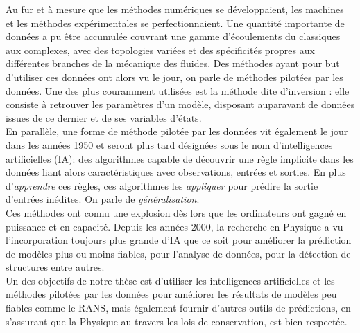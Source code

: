 \documentclass[a4paper,12pt]{article}
\numberwithin{equation}{section} %
\begin{document}
\noindent Au fur et à mesure que les méthodes numériques se développaient, les machines et les méthodes expérimentales se perfectionnaient. Une quantité importante de données a pu être accumulée couvrant une gamme d'écoulements du classiques aux complexes, avec des topologies variées et des spécificités propres aux différentes branches de la mécanique des fluides. Des méthodes ayant pour but d'utiliser ces données ont alors vu le jour, on parle de méthodes pilotées par les données. Une des plus couramment utilisées est la méthode dite d'inversion : elle consiste à retrouver les paramètres d'un modèle, disposant auparavant de données issues de ce dernier et de ses variables d'états. \\

\noindent En parallèle, une forme de méthode pilotée par les données vit également le jour dans les années 1950 et seront plus tard désignées sous le nom d'intelligences artificielles (IA): des algorithmes capable de découvrir une règle implicite dans les données liant alors caractéristiques avec observations, entrées et sorties. En plus d'\textit{apprendre} ces règles, ces algorithmes les \textit{appliquer} pour prédire la sortie d'entrées inédites. On parle de \textit{généralisation}.\\
Ces méthodes ont connu une explosion dès lors que les ordinateurs ont gagné en puissance et en capacité. Depuis les années 2000, la recherche en Physique a vu l'incorporation toujours plus grande d'IA que ce soit pour améliorer la prédiction de modèles plus ou moins fiables, pour l'analyse de données, pour la détection de structures entre autres. \\

\noindent Un des objectifs de notre thèse est d'utiliser les intelligences artificielles et les méthodes pilotées par les données pour améliorer les résultats de modèles peu fiables comme le RANS, mais également fournir d'autres outils de prédictions, en s'assurant que la Physique au travers les lois de conservation, est bien respectée.

\end{document}
